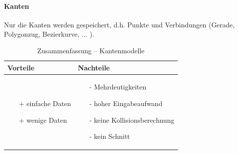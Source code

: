\paragraph*{Kanten}
Nur die Kanten werden gespeichert, d.h. Punkte und Verbindungen (Gerade, Polygonzug, Bezierkurve, ... ).
\begin{table}[hbt]
\centering
\begin{tabular}{|p{6.5cm}|p{6.5cm}|}
\hline
Vorteile & Nachteile\\
\hline
\vspace{-5mm}
\begin{itemize}
\setlength\itemsep{0em}
\item[+] einfache Daten
\item[+] wenige Daten
\end{itemize}
 &
 \vspace{-5mm}
\begin{itemize}
\setlength\itemsep{0em}
\item[-] Mehrdeutigkeiten
\item[-] hoher Eingabeaufwand
\item[-] keine Kollisionsberechnung
\item[-] kein Schnitt
\end{itemize}\\
\hline
\end{tabular}
\caption{Zusammenfassung -- Kantenmodelle}
\label{tab:Kantenmod}
\end{table}\\ 
